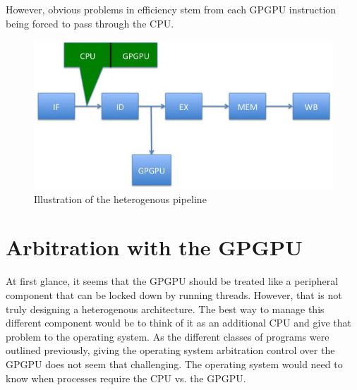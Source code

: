 However, obvious problems in efficiency stem from each GPGPU instruction being forced to pass through the CPU. 

\begin{figure}[h]
\includegraphics[scale=0.75]{diagrams/diag1.jpg}
\caption{Illustration of the heterogenous pipeline}
\end{figure}


\section*{Arbitration with the GPGPU}

At first glance, it seems that the GPGPU should be treated like a peripheral component that can be locked down by running threads. However, that is not truly designing a heterogenous architecture. The best way to manage this different component would be to think of it as an additional CPU and give that problem to the operating system. As the different classes of programs were outlined previously, giving the operating system arbitration control over the GPGPU does not seem that challenging. The operating system would need to know when processes require the CPU vs. the GPGPU. 










